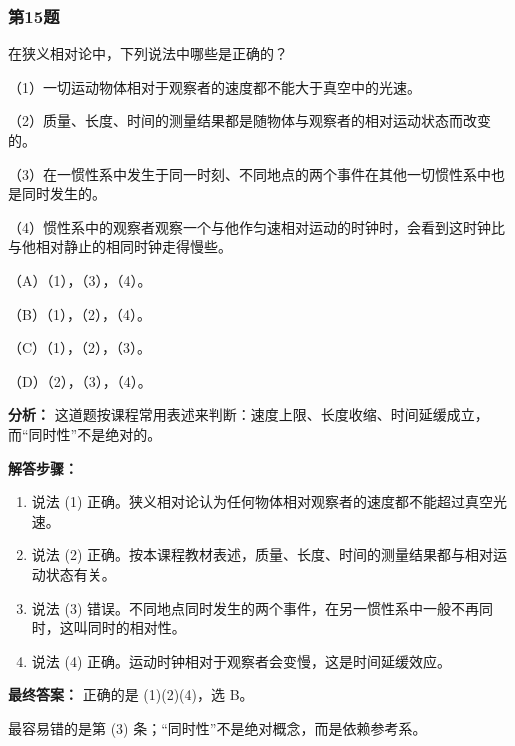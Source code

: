 \documentclass[12pt,a4paper]{ctexart}
\begin{document}
\subsubsection*{第15题}
\begin{tcolorbox}[colback=gray!2!white,colframe=black!60,title={题目}]
在狭义相对论中，下列说法中哪些是正确的？\par
（1）一切运动物体相对于观察者的速度都不能大于真空中的光速。\par
（2）质量、长度、时间的测量结果都是随物体与观察者的相对运动状态而改变的。\par
（3）在一惯性系中发生于同一时刻、不同地点的两个事件在其他一切惯性系中也是同时发生的。\par
（4）惯性系中的观察者观察一个与他作匀速相对运动的时钟时，会看到这时钟比与他相对静止的相同时钟走得慢些。\par
（A）（1），（3），（4）。\par
（B）（1），（2），（4）。\par
（C）（1），（2），（3）。\par
（D）（2），（3），（4）。\par
\end{tcolorbox}
\begin{tcolorbox}[colback=blue!2!white,colframe=blue!55!black,title={完整答案}]
\textbf{分析：}
这道题按课程常用表述来判断：速度上限、长度收缩、时间延缓成立，而“同时性”不是绝对的。\par
\textbf{解答步骤：}
\begin{enumerate}
\item 说法 (1) 正确。狭义相对论认为任何物体相对观察者的速度都不能超过真空光速。
\item 说法 (2) 正确。按本课程教材表述，质量、长度、时间的测量结果都与相对运动状态有关。
\item 说法 (3) 错误。不同地点同时发生的两个事件，在另一惯性系中一般不再同时，这叫同时的相对性。
\item 说法 (4) 正确。运动时钟相对于观察者会变慢，这是时间延缓效应。
\end{enumerate}
\textbf{最终答案：}
正确的是 (1)(2)(4)，选 B。\par
\end{tcolorbox}
\begin{tcolorbox}[colback=red!2!white,colframe=red!55!black,title={易错点}]
最容易错的是第 (3) 条；“同时性”不是绝对概念，而是依赖参考系。\par
\end{tcolorbox}
\end{document}
